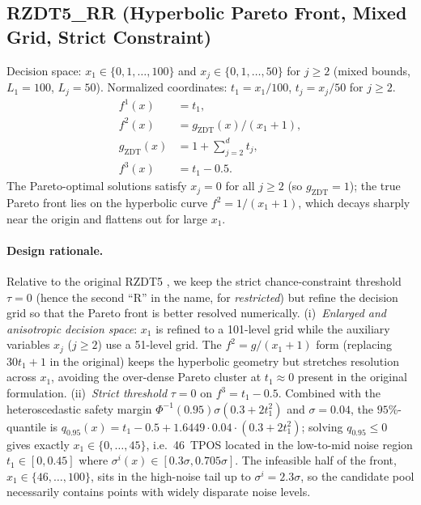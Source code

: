 \documentclass[12pt]{article}
\theoremstyle{plain}
\theoremstyle{definition}
\theoremstyle{remark}
\begin{document}
\subsection{RZDT5\_RR (Hyperbolic Pareto Front, Mixed Grid, Strict Constraint)}\label{app:rzdt5}

Decision space: $x_1 \in \{0, 1, \ldots, 100\}$ and
$x_j \in \{0, 1, \ldots, 50\}$ for $j \ge 2$ (mixed bounds,
$L_1=100$, $L_j=50$).  Normalized coordinates: $t_1 = x_1/100$,
$t_j = x_j/50$ for $j\ge2$.
\begin{align*}
  f^1(x) &= t_1, \\
  f^2(x) &= g_{\mathrm{ZDT}}(x) / (x_1 + 1), \\
  g_{\mathrm{ZDT}}(x)   &= 1 + \sum_{j=2}^{d} t_j, \\
  f^3(x) &= t_1 - 0.5.
\end{align*}
The Pareto-optimal solutions satisfy $x_j = 0$ for all $j \ge 2$
(so $g_{\mathrm{ZDT}} = 1$); the true Pareto front lies on the hyperbolic curve
$f^2 = 1/(x_1+1)$, which decays sharply near the origin and flattens
out for large $x_1$.

\paragraph{Design rationale.}
Relative to the original RZDT5 \citep{Zitzler2000}, we keep the
strict chance-constraint threshold $\tau=0$ (hence the second ``R''
in the name, for \emph{restricted}) but refine the decision grid so
that the Pareto front is better resolved numerically.
(i)~\emph{Enlarged and anisotropic decision space}: $x_1$ is
refined to a 101-level grid while the auxiliary variables $x_j$
($j\ge2$) use a 51-level grid.  The $f^2=g/(x_1+1)$ form (replacing
$30t_1+1$ in the original) keeps the hyperbolic geometry but
stretches resolution across $x_1$, avoiding the over-dense Pareto
cluster at $t_1\approx0$ present in the original formulation.
(ii)~\emph{Strict threshold} $\tau=0$ on $f^3=t_1-0.5$.  Combined
with the heteroscedastic safety margin
$\Phi^{-1}(0.95)\sigma(0.3+2t_1^2)$ and $\sigma=0.04$, the
$95\%$-quantile is
$q_{0.95}(x)=t_1-0.5+1.6449\cdot0.04\cdot(0.3+2t_1^2)$; solving
$q_{0.95}\le 0$ gives exactly $x_1\in\{0,\ldots,45\}$, i.e.\ 46~TPOS
located in the low-to-mid noise region
$t_1\in[0,0.45]$ where $\sigma^i(x)\in[0.3\sigma,0.705\sigma]$.
The infeasible half of the front, $x_1\in\{46,\ldots,100\}$, sits in
the high-noise tail up to $\sigma^i=2.3\sigma$, so the candidate
pool necessarily contains points with widely disparate noise levels.
\end{document}
